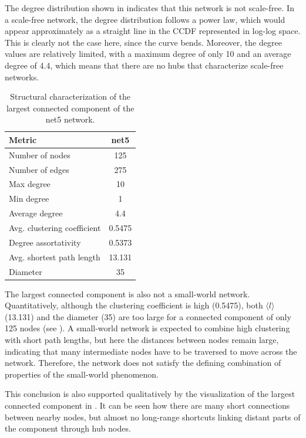\documentclass{article}
\begin{document}
The degree distribution shown in  indicates that this network is not scale-free. In a scale-free network, the degree distribution follows a power law, which would appear approximately as a straight line in the CCDF represented in log-log space. This is clearly not the case here, since the curve bends. Moreover, the degree values are relatively limited, with a maximum degree of only 10 and an average degree of 4.4, which means that there are no hubs that characterize scale-free networks.

\begin{table}[h]
\centering
\begin{tabular}{lc}
\toprule
\textbf{Metric} & \textbf{net5} \\
\midrule
Number of nodes & 125 \\
Number of edges & 275 \\
Max degree & 10 \\
Min degree & 1 \\
Average degree & 4.4 \\
Avg. clustering coefficient & 0.5475 \\
Degree assortativity & 0.5373 \\
Avg. shortest path length & 13.131 \\
Diameter & 35 \\
\bottomrule
\end{tabular}
\caption{Structural characterization of the largest connected component of the net5 network.}
\label{tab:network5_characterization}
\end{table}

The largest connected component is also not a small-world network. Quantitatively, although the clustering coefficient is high (0.5475), both $\langle l\rangle$ (13.131) and the diameter (35) are too large for a connected component of only 125 nodes (see ). A small-world network is expected to combine high clustering with short path lengths, but here the distances between nodes remain large, indicating that many intermediate nodes have to be traversed to move across the network. Therefore, the network does not satisfy the defining combination of properties of the small-world phenomenon.

This conclusion is also supported qualitatively by the visualization of the largest connected component in . It can be seen how there are many short connections between nearby nodes, but almost no long-range shortcuts linking distant parts of the component through hub nodes.
\end{document}
